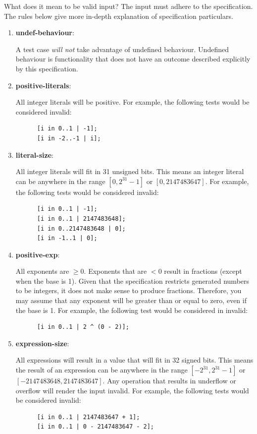 \documentclass{article}
\newcommand{\assertiondest}[1]{\hypertarget{#1}{\textbf{#1}:}}
\begin{document}
What does it mean to be valid input? The input must adhere to the specification. The rules below
give more in-depth explanation of specification particulars.
\begin{enumerate}
  \item
    \assertiondest{undef-behaviour}
    A test case \textit{will not} take advantage of undefined behaviour. Undefined behaviour is
    functionality that does not have an outcome described explicitly by this specification.
  \item
    \assertiondest{positive-literals}
    All integer literals will be positive. For example, the following tests would be considered
    invalid:
    \begin{lstlisting}
      [i in 0..1 | -1];
      [i in -2..-1 | i];
    \end{lstlisting}
  \item
    \assertiondest{literal-size}
    All integer literals will fit in 31 unsigned bits. This means an integer literal can be
    anywhere in the range $[0, 2^{31} - 1]$ or $[0, 2147483647]$. For example, the following tests
    would be considered invalid:
    \begin{lstlisting}
      [i in 0..1 | -1];
      [i in 0..1 | 2147483648];
      [i in 0..2147483648 | 0];
      [i in -1..1 | 0];
    \end{lstlisting}
  \item
    \assertiondest{positive-exp}
    All exponents are $\geq 0$. Exponents that are $< 0$ result in fractions (except when the
    base is 1). Given that the specification restricts generated numbers to be integers,  it does
    not make sense to produce fractions. Therefore, you may assume that any exponent will be
    greater than or equal to zero, even if the base is 1. For example, the following test would be
    considered in invalid:
    \begin{lstlisting}
      [i in 0..1 | 2 ^ (0 - 2)];
    \end{lstlisting}
  \item
    \assertiondest{expression-size}
    All expressions will result in a value that will fit in 32 signed bits. This means the result
    of an expression can be anywhere in the range $[-2^{31}, 2^{31} - 1]$ or $[-2147483648,
    2147483647]$. Any operation that results in underflow or overflow will render the input
    invalid. For example, the following tests would be considered invalid:
    \begin{lstlisting}
      [i in 0..1 | 2147483647 + 1];
      [i in 0..1 | 0 - 2147483647 - 2];

\end{lstlisting}
\end{enumerate}
\end{document}
